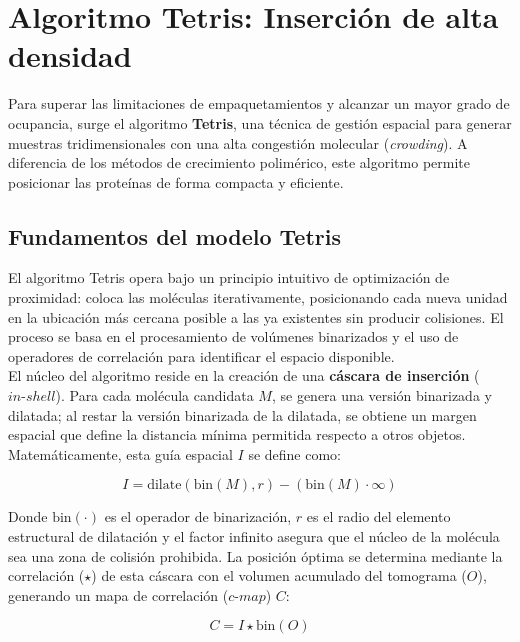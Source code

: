 \section{Algoritmo Tetris: Inserción de alta densidad}

Para superar las limitaciones de empaquetamientos y alcanzar un mayor grado de ocupancia, surge el algoritmo \textbf{Tetris}, una técnica de gestión espacial para generar muestras tridimensionales con una alta congestión molecular (\textit{crowding}). A diferencia de los métodos de crecimiento polimérico, este algoritmo permite posicionar las proteínas de forma compacta y eficiente.

\subsection{Fundamentos del modelo Tetris}

El algoritmo Tetris opera bajo un principio intuitivo de optimización de proximidad: coloca las moléculas iterativamente, posicionando cada nueva unidad en la ubicación más cercana posible a las ya existentes sin producir colisiones. El proceso se basa en el procesamiento de volúmenes binarizados y el uso de operadores de correlación para identificar el espacio disponible.\\

El núcleo del algoritmo reside en la creación de una \textbf{cáscara de inserción} ($in\text{-}shell$). Para cada molécula candidata $M$, se genera una versión binarizada y dilatada; al restar la versión binarizada de la dilatada, se obtiene un margen espacial que define la distancia mínima permitida respecto a otros objetos. Matemáticamente, esta guía espacial $I$ se define como:

\begin{equation}
I = \text{dilate}(\text{bin}(M), r) - (\text{bin}(M) \cdot \infty)
\end{equation}

Donde $\text{bin}(\cdot)$ es el operador de binarización, $r$ es el radio del elemento estructural de dilatación y el factor infinito asegura que el núcleo de la molécula sea una zona de colisión prohibida. La posición óptima se determina mediante la correlación ($\star$) de esta cáscara con el volumen acumulado del tomograma ($O$), generando un mapa de correlación ($c\text{-}map$) $C$:

\begin{equation}
C = I \star \text{bin}(O)
\end{equation}

